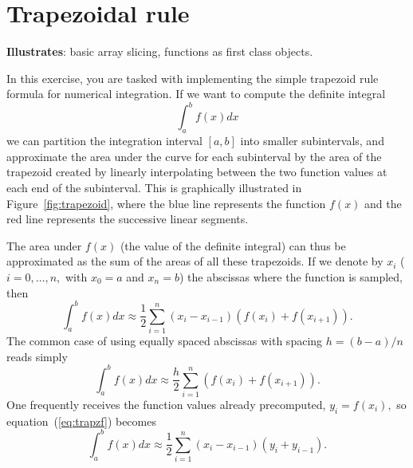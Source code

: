 \section{Trapezoidal rule}
\label{sec:trapezoid}

\textbf{Illustrates}: basic array slicing, functions as first class
objects.

In this exercise, you are tasked with implementing the simple trapezoid
rule formula for numerical integration. If we want to compute the
definite integral \begin{equation}
\int_{a}^{b}f(x)dx\end{equation}
we can partition the integration interval $[a,b]$ into smaller subintervals,
and approximate the area under the curve for each subinterval by the
area of the trapezoid created by linearly interpolating between the
two function values at each end of the subinterval. This is graphically
illustrated in Figure~\ref{fig:trapezoid}, where the blue line represents
the function $f(x)$ and the red line represents the successive linear
segments.

The area under $f(x)$ (the value of the definite integral) can thus
be approximated as the sum of the areas of all these trapezoids. If
we denote by $x_{i}$ ($i=0,\ldots,n,$ with $x_{0}=a$ and $x_{n}=b$)
the abscissas where the function is sampled, then \begin{equation}
\int_{a}^{b}f(x)dx\approx\frac{1}{2}\sum_{i=1}^{n}\left(x_{i}-x_{i-1}\right)\left(f(x_{i})+f(x_{i+1})\right).\label{eq:trapzf}\end{equation}
The common case of using equally spaced abscissas with spacing $h=(b-a)/n$
reads simply \begin{equation}
\int_{a}^{b}f(x)dx\approx\frac{h}{2}\sum_{i=1}^{n}\left(f(x_{i})+f(x_{i+1})\right).\label{eq:trapzf2}\end{equation}
One frequently receives the function values already precomputed, $y_{i}=f(x_{i}),$
so equation~(\ref{eq:trapzf}) becomes \begin{equation}
\int_{a}^{b}f(x)dx\approx\frac{1}{2}\sum_{i=1}^{n}\left(x_{i}-x_{i-1}\right)\left(y_{i}+y_{i-1}\right).\label{eq:trapz}\end{equation}


